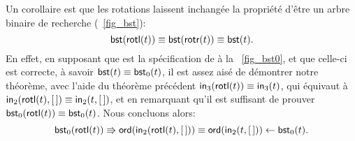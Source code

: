 Un corollaire est que les rotations laissent inchangée la propriété
d'être un arbre binaire de recherche (\fig~\vref{fig_bst}):
\begin{equation*}
\abovedisplayskip=5pt
\belowdisplayskip=5pt
\fun{bst}(\fun{rotl}(t)) \equiv \fun{bst}(\fun{rotr}(t)) \equiv \fun{bst}(t).
\end{equation*}
En effet, en supposant que  est la spécification de
 à la \fig~\vref{fig_bst0}, et que celle-ci est
correcte, à savoir \(\textsf{bst}(t) \equiv \textsf{bst}_0(t)\), il est
assez aisé de démontrer notre théorème, avec l'aide du théorème
précédent \(\textsf{in}_3(\textsf{rotl}(t)) \equiv \textsf{in}_3(t)\), qui
équivaut à \(\textsf{in}_2(\textsf{rotl}(t),[\,]) \equiv \textsf{in}_2(t,[\,])\),
et en remarquant qu'il est suffisant de prouver
\(\textsf{bst}_0(\textsf{rotl}(t)) \equiv \textsf{bst}_0(t)\). Nous concluons
alors:
\begin{equation*}
\textsf{bst}_0(\textsf{rotl}(t))
\Rrightarrow \textsf{ord}(\textsf{in}_2(\textsf{rotl}(t),[\,]))
\equiv \textsf{ord}(\textsf{in}_2(t,[\,]))
\leftarrow \textsf{bst}_0(t).
\end{equation*}


